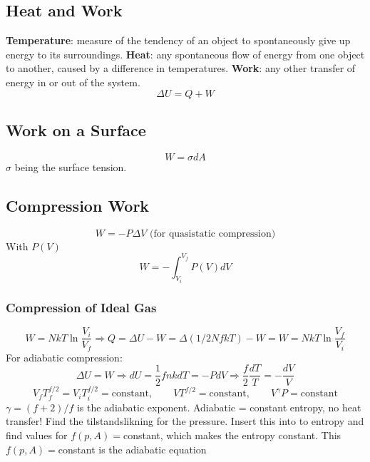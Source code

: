 \documentclass[a4paper,norsk, 10pt]{article}
\begin{document}
\subsection{Heat and Work}
\textbf{Temperature}: measure of the tendency of an object to spontaneously give up energy to its surroundings.
\textbf{Heat}: any spontaneous flow of energy from one object to another, caused by a difference in temperatures.
\textbf{Work}: any other transfer of energy in or out of the system.
\begin{equation}
\Delta U = Q + W
\end{equation}
\subsection{Work on a Surface}
\begin{equation}
W = \sigma dA
\end{equation}
$\sigma$ being the surface tension.
\subsection{Compression Work}
\begin{equation}
W = -P\Delta V \text{ (for quasistatic compression)}
\end{equation}
With $P(V)$
\begin{equation}
W = -\int_{V_i}^{V_f}P(V)dV
\end{equation}
\subsubsection{Compression of Ideal Gas}
\begin{equation}
W = NkT\ln\frac{V_i}{V_f} \Rightarrow Q = \Delta U - W = \Delta (1/2 NfkT) - W = W = NkT\ln\frac{V_f}{V_i}
\end{equation}
For adiabatic compression:
\begin{equation}
\Delta U = W \Rightarrow dU = \frac{1}{2}fnkdT = -PdV \Rightarrow \frac{f}{2}\frac{dT}{T} = -\frac{dV}{V}
\end{equation}
\begin{equation}
V_f T_f^{f/2} = V_i T_i^{f/2} = \text{constant}, \qquad VT^{f/2} = \text{constant},\qquad V^\gamma P = \text{constant}
\end{equation}
$\gamma = (f+2)/f$ is the adiabatic exponent. 
Adiabatic = constant entropy, no heat transfer! Find the tilstandslikning for the pressure. Insert this into to entropy and find values for $f(p,A) = $constant, which makes the entropy constant. This $f(p,A) = $constant is the adiabatic equation
\end{document}
